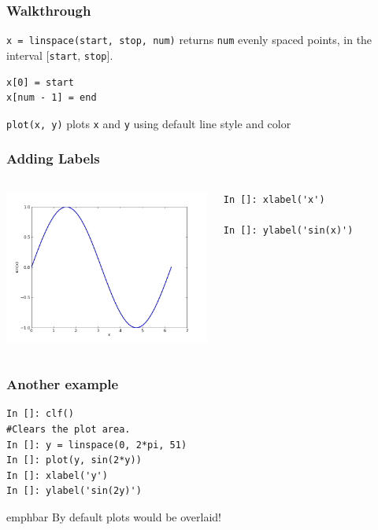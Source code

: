 \documentclass[14pt,compress]{beamer}
\newcommand{\emphbar}[1]
{\begin{beamercolorbox}[rounded=true]{emphbar} 
      {#1}
 \end{beamercolorbox}
}
\newcommand{\typ}[1]{\lstinline{#1}}
\begin{document}
\begin{frame}[fragile]
\frametitle{Walkthrough}
\begin{block}{\typ{x = linspace(start, stop, num)} }
returns \typ{num} evenly spaced points, in the interval [\typ{start}, \typ{stop}].
\end{block}
\begin{lstlisting}
x[0] = start
x[num - 1] = end
\end{lstlisting}
\vspace*{.35in}
\begin{block}{\typ{plot(x, y)}}
plots \typ{x} and \typ{y} using default line style and color
\end{block}
\end{frame}

\begin{frame}[fragile]
\frametitle{Adding Labels}
\begin{columns}
  \hspace*{-0.45in}
  \includegraphics[height=2in, interpolate=true]{data/label}  
  \hspace*{0.5in}
  \begin{block}{}
  \small
  \begin{lstlisting}
In []: xlabel('x')

In []: ylabel('sin(x)')
  \end{lstlisting}
  \small

  \end{block}
\end{columns}
\end{frame}

\begin{frame}[fragile]
\frametitle{Another example}
  \begin{lstlisting}
In []: clf()
#Clears the plot area.
In []: y = linspace(0, 2*pi, 51)
In []: plot(y, sin(2*y))
In []: xlabel('y')
In []: ylabel('sin(2y)')
  \end{lstlisting}
\emphbar{By default plots would be overlaid!}
\end{frame}
\end{document}
